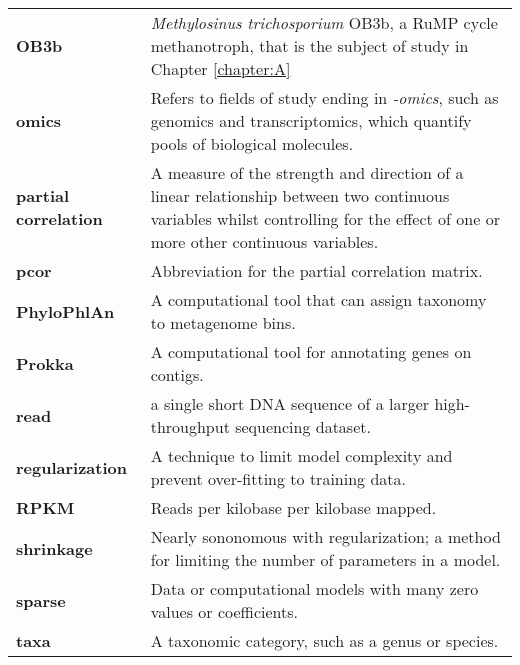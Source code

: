 \begin{singlespace}
\begin{longtable}{ p{}  p{} }
\textbf{OB3b} & \textit{Methylosinus trichosporium} {OB3b}, a RuMP cycle methanotroph, that is the subject of study in Chapter \ref{chapter:A}  \\
\textbf{omics} & Refers to fields of study ending in \textit{-omics}, such as genomics and transcriptomics, which quantify pools of biological molecules. \\
\textbf{partial correlation} & A measure of the strength and direction of a linear relationship between two continuous variables whilst controlling for the effect of one or more other continuous variables. \\
\textbf{pcor} & Abbreviation for the partial correlation matrix. \\
\textbf{PhyloPhlAn} & A computational tool that can assign taxonomy to metagenome bins. \\
\textbf{Prokka} & A computational tool for annotating genes on contigs. \\
\textbf{read} & a single short DNA sequence of a larger high-throughput sequencing dataset. \\
\textbf{regularization} & A technique to limit model complexity and prevent over-fitting to training data. \\
\textbf{RPKM} & Reads per kilobase per kilobase mapped. \\ %
\textbf{shrinkage} & Nearly sononomous with regularization; a method for limiting the number of parameters in a model. \\
\textbf{sparse} & Data or computational models with many zero values or coefficients. \\
\textbf{taxa} & A taxonomic category, such as a genus or species. \\

\end{longtable}
\end{singlespace}
